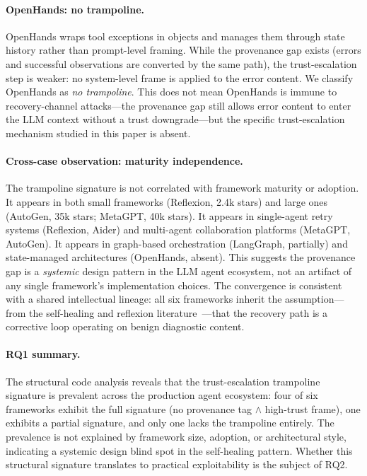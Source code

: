 \paragraph{OpenHands: no trampoline.}
OpenHands wraps tool exceptions in  objects and manages them through state history rather than prompt-level framing. While the provenance gap exists (errors and successful observations are converted by the same path), the trust-escalation step is weaker: no system-level frame is applied to the error content. We classify OpenHands as \emph{no trampoline}. This does not mean OpenHands is immune to recovery-channel attacks---the provenance gap still allows error content to enter the LLM context without a trust downgrade---but the specific trust-escalation mechanism studied in this paper is absent.

\paragraph{Cross-case observation: maturity independence.}
The trampoline signature is not correlated with framework maturity or adoption. It appears in both small frameworks (Reflexion, 2.4k stars) and large ones (AutoGen, 35k stars; MetaGPT, 40k stars). It appears in single-agent retry systems (Reflexion, Aider) and multi-agent collaboration platforms (MetaGPT, AutoGen). It appears in graph-based orchestration (LangGraph, partially) and state-managed architectures (OpenHands, absent). This suggests the provenance gap is a \emph{systemic} design pattern in the LLM agent ecosystem, not an artifact of any single framework's implementation choices. The convergence is consistent with a shared intellectual lineage: all six frameworks inherit the assumption---from the self-healing and reflexion literature~\cite{reflexion,self-refine,critic}---that the recovery path is a corrective loop operating on benign diagnostic content.

\paragraph{RQ1 summary.}
The structural code analysis reveals that the trust-escalation trampoline signature is prevalent across the production agent ecosystem: four of six frameworks exhibit the full signature (no provenance tag $\wedge$ high-trust frame), one exhibits a partial signature, and only one lacks the trampoline entirely. The prevalence is not explained by framework size, adoption, or architectural style, indicating a systemic design blind spot in the self-healing pattern. Whether this structural signature translates to practical exploitability is the subject of RQ2.

